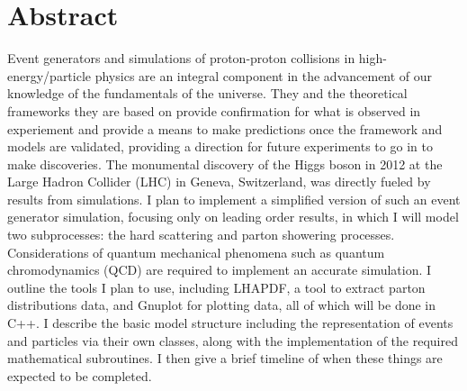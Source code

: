 \section*{Abstract}

Event generators and simulations of proton-proton collisions in high-energy/particle physics are an integral component in the advancement of our knowledge of the fundamentals of the universe. They and the theoretical frameworks they are based on provide confirmation for what is observed in experiement and provide a means to make predictions once the framework and models are validated, providing a direction for future experiments to go in to make discoveries. The monumental discovery of the Higgs boson in 2012 at the Large Hadron Collider (LHC) in Geneva, Switzerland, was directly fueled by results from simulations. I plan to implement a simplified version of such an event generator simulation, focusing only on leading order results, in which I will model two subprocesses: the hard scattering and parton showering processes. Considerations of quantum mechanical phenomena such as quantum chromodynamics (QCD) are required to implement an accurate simulation. I outline the tools I plan to use, including \textsc{LHAPDF}, a tool to extract parton distributions data, and Gnuplot for plotting data, all of which will be done in C++. I describe the basic model structure including the representation of events and particles via their own classes, along with the implementation of the required mathematical subroutines. I then give a brief timeline of when these things are expected to be completed.

